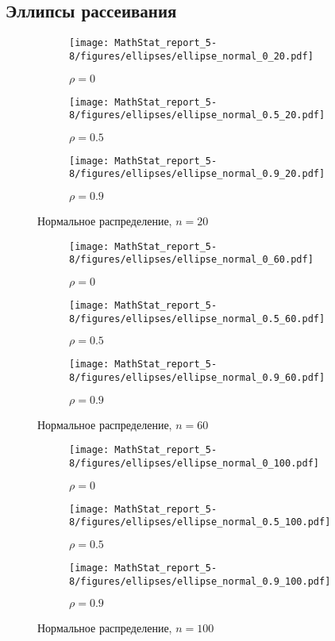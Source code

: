 \documentclass[12pt]{article}
\begin{document}
	\subsection{Эллипсы рассеивания}
	\begin{figure}[H]
		\centering
		\begin{subfigure}[t]{.3\linewidth}
			\centering\texttt{[image: MathStat\_report\_5-8/figures/ellipses/ellipse\_normal\_0\_20.pdf]}
			\caption*{$\rho = 0$}
		\end{subfigure}
		\begin{subfigure}[t]{.3\linewidth}
			\centering\texttt{[image: MathStat\_report\_5-8/figures/ellipses/ellipse\_normal\_0.5\_20.pdf]}
			\caption*{$\rho = 0.5$}
		\end{subfigure}
		\begin{subfigure}[t]{.3\linewidth}
			\centering\texttt{[image: MathStat\_report\_5-8/figures/ellipses/ellipse\_normal\_0.9\_20.pdf]}
			\caption*{$\rho = 0.9$}
		\end{subfigure}
		\caption{Нормальное распределение, $n=20$}
	\end{figure}
	\begin{figure}[H]
		\centering
		\begin{subfigure}[t]{.3\linewidth}
			\centering\texttt{[image: MathStat\_report\_5-8/figures/ellipses/ellipse\_normal\_0\_60.pdf]}
			\caption*{$\rho = 0$}
		\end{subfigure}
		\begin{subfigure}[t]{.3\linewidth}
			\centering\texttt{[image: MathStat\_report\_5-8/figures/ellipses/ellipse\_normal\_0.5\_60.pdf]}
			\caption*{$\rho = 0.5$}
		\end{subfigure}
		\begin{subfigure}[t]{.3\linewidth}
			\centering\texttt{[image: MathStat\_report\_5-8/figures/ellipses/ellipse\_normal\_0.9\_60.pdf]}
			\caption*{$\rho = 0.9$}
		\end{subfigure}
		\caption{Нормальное распределение, $n=60$}
	\end{figure}
	\begin{figure}[H]
		\centering
		\begin{subfigure}[t]{.3\linewidth}
			\centering\texttt{[image: MathStat\_report\_5-8/figures/ellipses/ellipse\_normal\_0\_100.pdf]}
			\caption*{$\rho = 0$}
		\end{subfigure}
		\begin{subfigure}[t]{.3\linewidth}
			\centering\texttt{[image: MathStat\_report\_5-8/figures/ellipses/ellipse\_normal\_0.5\_100.pdf]}
			\caption*{$\rho = 0.5$}
		\end{subfigure}
		\begin{subfigure}[t]{.3\linewidth}
			\centering\texttt{[image: MathStat\_report\_5-8/figures/ellipses/ellipse\_normal\_0.9\_100.pdf]}
			\caption*{$\rho = 0.9$}
		\end{subfigure}
		\caption{Нормальное распределение, $n=100$}
	\end{figure}
	
\end{document}
